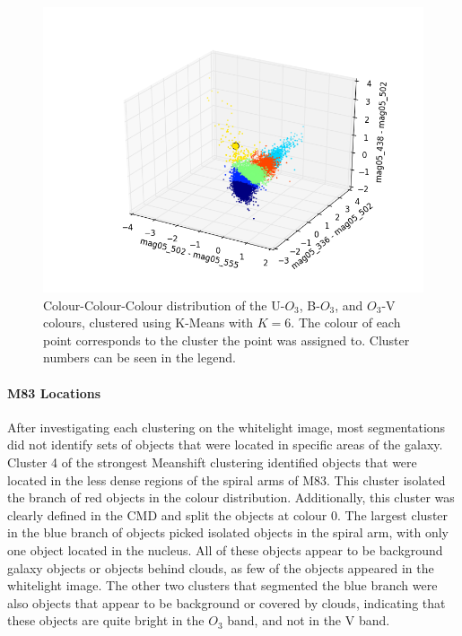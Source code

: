 \begin{figure}
\centering
\includegraphics[width=\linewidth]{figs/kmeans_3d_color_6cl_mag05_502-mag05_555vsmag05_336-mag05_502vsmag05_438-mag05_502}
\caption{Colour-Colour-Colour distribution of the U-$O_{3}$, B-$O_{3}$, and $O_{3}$-V colours, clustered using K-Means with $K=6$. The colour of each point corresponds to the cluster the point was assigned to. Cluster numbers can be seen in the legend.}
\label{fig:fig:OIIIVKM3d}
\end{figure}

\paragraph{M83 Locations}
After investigating each clustering on the whitelight image, most segmentations did not identify sets of objects that were located in specific areas of the galaxy.
Cluster 4 of the strongest Meanshift clustering identified objects that were located in the less dense regions of the spiral arms of M83.
This cluster isolated the branch of red objects in the colour distribution.
Additionally, this cluster was clearly defined in the CMD and split the objects at colour 0.
The largest cluster in the blue branch of objects picked isolated objects in the spiral arm, with only one object located in the nucleus.
All of these objects appear to be background galaxy objects or objects behind clouds, as few of the objects appeared in the whitelight image.
The other two clusters that segmented the blue branch were also objects that appear to be background or covered by clouds, indicating that these objects are quite bright in the $O_{3}$ band, and not in the V band.

